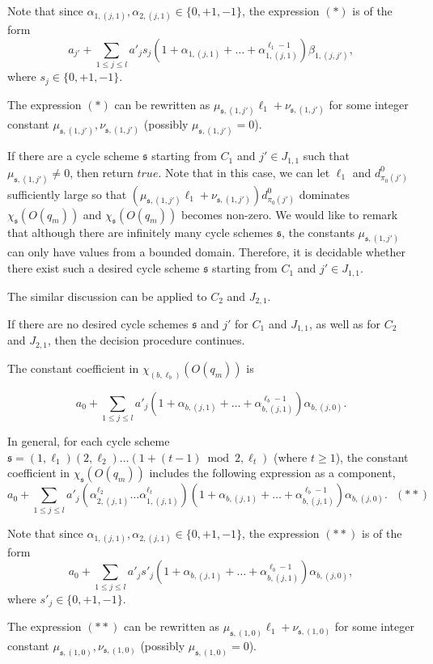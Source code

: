 \documentclass[runningheads,a4paper]{llncs}
\def\schm{{\mathfrak{s} }}
\begin{document}
Note that since $\alpha_{1,(j,1)},\alpha_{2,(j,1)} \in \{0,+1,-1\}$, the expression $(\ast)$ is of the form 
\[a_{j'} + \sum \limits_{1 \le j \le l} a'_j  s_j (1+\alpha_{1,(j,1)} + \dots +\alpha^{\ell_1-1}_{1,(j,1)})\beta_{1,(j,j')},\]
where $s_j \in \{0,+1,-1\}$.

The expression $(\ast)$ can be rewritten as $\mu_{\schm,(1,j')} \ell_1 + \nu_{\schm,(1,j')}$ for some integer constant $\mu_{\schm,(1,j')},\nu_{\schm,(1,j')}$ (possibly $\mu_{\schm,(1,j')}=0$). 

If there are a cycle scheme $\schm$ starting from $C_1$  and $j' \in J_{1,1}$ such that $\mu_{\schm,(1,j')} \neq 0$, then return $true$. Note that in this case, we can let $\ell_1$ and $d^0_{\pi_0(j')}$ sufficiently large so that $(\mu_{\schm,(1,j')} \ell_1 + \nu_{\schm,(1,j')})d^0_{\pi_0(j')}$ dominates $\chi_{\schm}(O(q_m))$ and $\chi_{\schm}(O(q_m))$ becomes non-zero. We would like to remark that although there are infinitely many cycle schemes $\schm$, the constants $\mu_{\schm,(1,j')}$ can only have values from a bounded domain. Therefore, it is decidable whether there exist such a desired cycle scheme $\schm$ starting from $C_1$ and $j' \in J_{1,1}$.

The similar discussion can be applied to $C_2$ and $J_{2,1}$.

If there are no desired cycle schemes $\schm$ and $j'$ for $C_1$ and $J_{1,1}$, as well as for  $C_2$ and $J_{2,1}$, then the decision procedure continues.

The constant coefficient in $\chi_{(b,\ell_b)}(O(q_m))$ is 

\[a_0 + \sum \limits_{1 \le j \le l} a'_j (1+\alpha_{b,(j,1)} + \dots +\alpha^{\ell_b-1}_{b,(j,1)})\alpha_{b,(j,0)}.\]

In general, for each cycle scheme $\schm=(1,\ell_1)(2,\ell_2) \dots (1+(t-1) \bmod 2,\ell_{t})$ (where $t \ge 1$), the constant coefficient in $\chi_{\schm}(O(q_m))$ includes the following expression as a component,
%
\[a_0 + \sum \limits_{1 \le j \le l} a'_j (\alpha^{\ell_2}_{2,(j,1)} \dots \alpha^{\ell_t}_{1,(j,1)}) (1+\alpha_{b,(j,1)} + \dots +\alpha^{\ell_b-1}_{b,(j,1)})\alpha_{b,(j,0)}. \ \ \  (\ast\ast)\]

Note that since $\alpha_{1,(j,1)},\alpha_{2,(j,1)} \in \{0,+1,-1\}$, the expression $(\ast\ast)$ is of the form 
\[a_0 + \sum \limits_{1 \le j \le l} a'_j  s'_j (1+\alpha_{b,(j,1)} + \dots +\alpha^{\ell_b-1}_{b,(j,1)})\alpha_{b,(j,0)},\]
where $s'_j \in \{0,+1,-1\}$.

The expression $(\ast\ast)$ can be rewritten as $\mu_{\schm,(1,0)} \ell_1 + \nu_{\schm,(1,0)}$ for some integer constant $\mu_{\schm,(1,0)},\nu_{\schm, (1,0)}$ (possibly $\mu_{\schm,(1,0)}=0$). 
\end{document}
